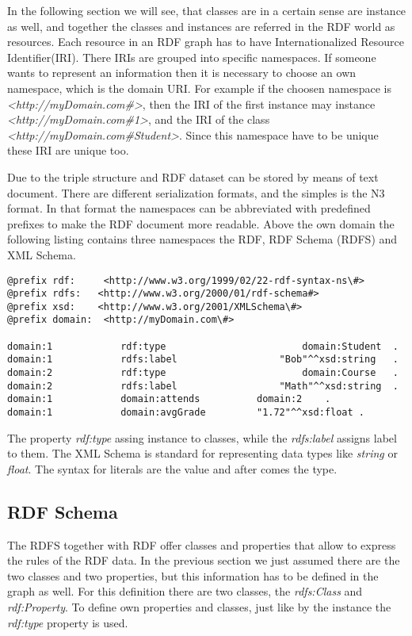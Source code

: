 In the following section we will see, that classes are in a certain sense are instance as well, and together the classes and instances are referred in the RDF world as resources. Each resource in an RDF graph has to have Internationalized Resource Identifier(IRI). There IRIs are grouped into specific namespaces. If someone wants to represent an information then it is necessary to choose an own namespace, which is the domain URI. For example if the choosen namespace is \textit{<http://myDomain.com\#>}, then the IRI of the first instance may instance \textit{<http://myDomain.com\#1>}, and the IRI of the class \textit{<http://myDomain.com\#Student>}. Since this namespace have to be unique these IRI are unique too. 

Due to the triple structure and RDF dataset can be stored by means of text document. There are different serialization formats, and the simples is the N3 format. In that format the namespaces can be abbreviated with predefined prefixes to make the RDF document more readable. Above the own domain the following listing contains three namespaces the RDF, RDF Schema (RDFS) and XML Schema.


\begin{lstlisting}[basicstyle=\footnotesize, captionpos=b, caption=RDF data in N3 serialization format, label=lst:sparql,
frame=single]
@prefix rdf:  	 <http://www.w3.org/1999/02/22-rdf-syntax-ns\#>
@prefix rdfs:   <http://www.w3.org/2000/01/rdf-schema#>
@prefix xsd:  	<http://www.w3.org/2001/XMLSchema\#>
@prefix domain:  <http://myDomain.com\#>

domain:1			rdf:type						domain:Student 	.
domain:1			rdfs:label					"Bob"^^xsd:string 	.
domain:2			rdf:type						domain:Course 	.
domain:2			rdfs:label					"Math"^^xsd:string 	.
domain:1			domain:attends			domain:2 	.
domain:1			domain:avgGrade			"1.72"^^xsd:float .
\end{lstlisting}


The property \textit{rdf:type} assing instance to classes, while the \textit{rdfs:label} assigns label to them. The XML Schema is standard for representing data types like \textit{string} or \textit{float}. The syntax for literals are the value and after comes the type. 

\subsection{RDF Schema}

The RDFS together with RDF offer classes and properties that allow to express the rules of the RDF data. In the previous section we just assumed there are the two classes and two properties, but this information has to be defined in the graph as well. For this definition there are two classes,  the \textit{rdfs:Class} and \textit{rdf:Property}. To define own properties and classes, just like by the instance the \textit{rdf:type} property is used.


